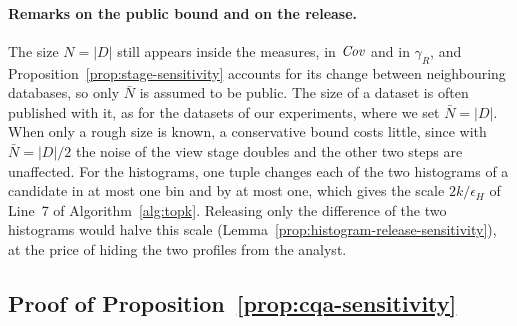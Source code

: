 \paragraph{Remarks on the public bound and on the release.}
The size $N=|D|$ still appears inside the measures, in $\mathit{Cov}$ and in $\gamma_R$, and Proposition~\ref{prop:stage-sensitivity} accounts for its change between neighbouring databases, so only $\bar N$ is assumed to be public.
The size of a dataset is often published with it, as for the datasets of our experiments, where we set $\bar N=|D|$.
When only a rough size is known, a conservative bound costs little, since with $\bar N=|D|/2$ the noise of the view stage doubles and the other two steps are unaffected.
For the histograms, one tuple changes each of the two histograms of a candidate in at most one bin and by at most one, which gives the scale $2k/\epsilon_H$ of Line~7 of Algorithm~\ref{alg:topk}.
Releasing only the difference of the two histograms would halve this scale (Lemma~\ref{prop:histogram-release-sensitivity}), at the price of hiding the two profiles from the analyst.

\subsection{Proof of Proposition~\ref{prop:cqa-sensitivity}}
\label{app:proof-cqa}

